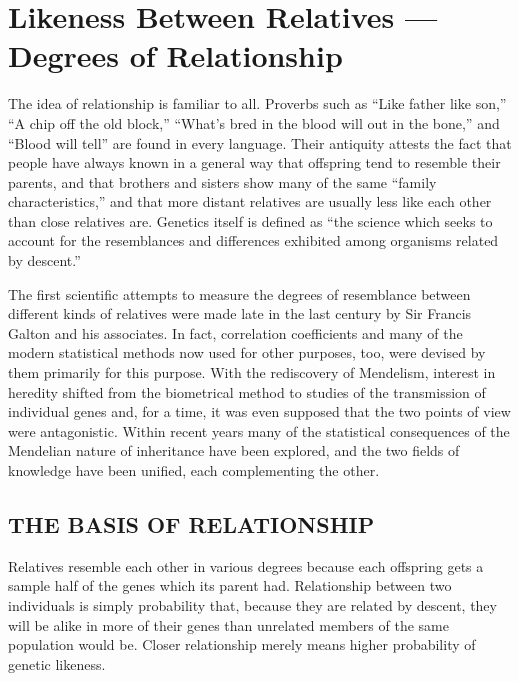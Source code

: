 \chapter{Likeness Between Relatives --- Degrees of Relationship}
\label{cha:Lush_Chapter_20}

The idea of relationship is familiar to all. Proverbs such as ``Like
father like son,'' ``A chip off the old block,'' ``What's bred in the blood
will out in the bone,'' and ``Blood will tell'' are found in every language.
Their antiquity attests the fact that people have always known
in a general way that offspring tend to resemble their parents, and that
brothers and sisters show many of the same ``family characteristics,''
and that more distant relatives are usually less like each other than close
relatives are. Genetics itself is defined as ``the science which seeks to
account for the resemblances and differences exhibited among organisms
related by descent.''

The first scientific attempts to measure the degrees of resemblance
between different kinds of relatives were made late in the last century
by Sir Francis Galton and his associates. In fact, correlation coefficients
and many of the modern statistical methods now used for other purposes,
too, were devised by them primarily for this purpose. With the
rediscovery of Mendelism, interest in heredity shifted from the biometrical
method to studies of the transmission of individual genes and, for
a time, it was even supposed that the two points of view were antagonistic.
Within recent years many of the statistical consequences of the
Mendelian nature of inheritance have been explored, and the two fields
of knowledge have been unified, each complementing the other.

\section*{THE BASIS OF RELATIONSHIP}

Relatives resemble each other in various degrees because each offspring
gets a sample half of the genes which its parent had. Relationship
between two individuals is simply probability that, because they
are related by descent, they will be alike in more of their genes than
unrelated members of the same population would be. Closer relationship
merely means higher probability of genetic likeness.

